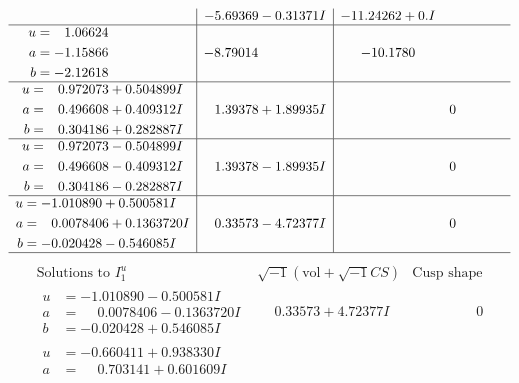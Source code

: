 \documentclass[1p]{elsarticle_modified}
\theoremstyle{definition}
\newcommand{\I}{\sqrt{-1}}
\begin{document}
$$\begin{array}{c|c|c}
 & -5.69369 - 0.31371 I & -11.24262 + 0. I\phantom{ +0.000000I} \\ \hline\begin{aligned}
u &= \phantom{-}1.06624\phantom{ +0.000000I} \\
a &= -1.15866\phantom{ +0.000000I} \\
b &= -2.12618\phantom{ +0.000000I}\end{aligned}
 & -8.79014\phantom{ +0.000000I} & -10.1780\phantom{ +0.000000I} \\ \hline\begin{aligned}
u &= \phantom{-}0.972073 + 0.504899 I \\
a &= \phantom{-}0.496608 + 0.409312 I \\
b &= \phantom{-}0.304186 + 0.282887 I\end{aligned}
 & \phantom{-}1.39378 + 1.89935 I & \phantom{-0.000000 } 0 \\ \hline\begin{aligned}
u &= \phantom{-}0.972073 - 0.504899 I \\
a &= \phantom{-}0.496608 - 0.409312 I \\
b &= \phantom{-}0.304186 - 0.282887 I\end{aligned}
 & \phantom{-}1.39378 - 1.89935 I & \phantom{-0.000000 } 0 \\ \hline\begin{aligned}
u &= -1.010890 + 0.500581 I \\
a &= \phantom{-}0.0078406 + 0.1363720 I \\
b &= -0.020428 - 0.546085 I\end{aligned}
 & \phantom{-}0.33573 - 4.72377 I & \phantom{-0.000000 } 0\\
 \hline 
 \end{array}$$\newpage$$\begin{array}{c|c|c}  
\text{Solutions to }I^u_{1}& \I (\text{vol} + \sqrt{-1}CS) & \text{Cusp shape}\\
 \hline 
\begin{aligned}
u &= -1.010890 - 0.500581 I \\
a &= \phantom{-}0.0078406 - 0.1363720 I \\
b &= -0.020428 + 0.546085 I\end{aligned}
 & \phantom{-}0.33573 + 4.72377 I & \phantom{-0.000000 } 0 \\ \hline\begin{aligned}
u &= -0.660411 + 0.938330 I \\
a &= \phantom{-}0.703141 + 0.601609 I \\

\end{aligned}
\end{array}$$
\end{document}
